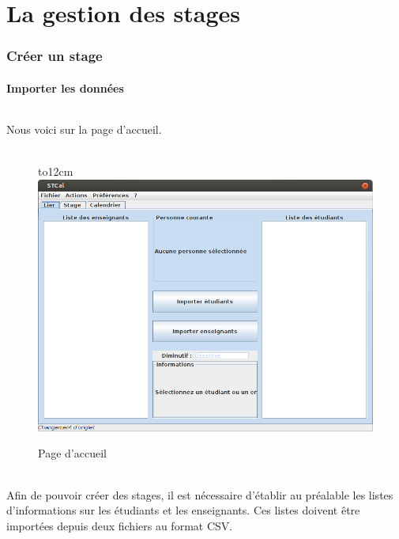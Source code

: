 \documentclass[a4paper,10pt]{report}
\begin{document}
\part{La gestion des stages}
    \section{Créer un stage} 
      
      \subsection{Importer les données}
      
      \paragraph{}
	Nous voici sur la page d'accueil.
	~\\~\\
	\begin{figure}[!h]
		\hbox to12cm{\hss\includegraphics[width=14cm]{../general/accueil.png}\hss}
		\caption{Page d'accueil}
	\end{figure}
	
	
      \paragraph{}
	Afin de pouvoir créer des stages, il est nécessaire d'établir au préalable les listes d'informations sur les étudiants et les enseignants.
	Ces listes doivent être importées depuis deux fichiers au format CSV.
	
\end{document}
